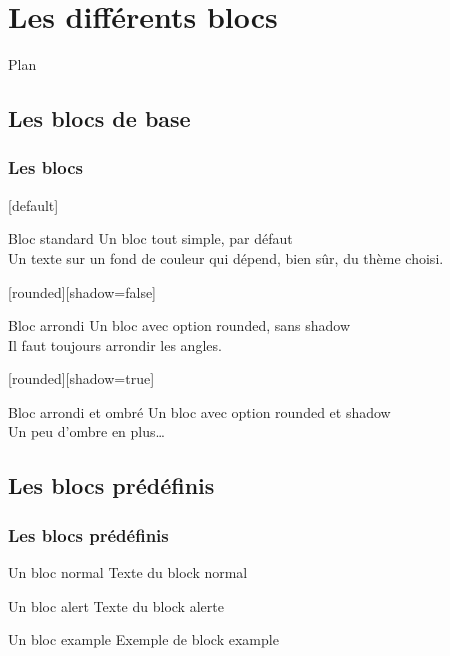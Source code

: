 \documentclass[slidetop,11pt]{beamer}
\begin{document}
\section{Les différents blocs}
\begin{frame}{Plan}
  \tableofcontents[sections=\thesection]
\end{frame}

\subsection{Les blocs de base}
\begin{frame} 
\frametitle{Les blocs}
[default]  
\begin{block}{Bloc standard}
Un bloc tout simple, par défaut\\
Un texte sur un fond de couleur qui
dépend, bien sûr, du thème choisi.
\end{block}

[rounded][shadow=false]
\begin{block}{Bloc arrondi}
Un bloc avec option rounded, sans shadow\\
Il faut toujours arrondir les angles.
\end{block}

[rounded][shadow=true]
\begin{block}{Bloc arrondi et ombré}
Un bloc avec option rounded et shadow\\
Un peu d'ombre en plus\dots
\end{block}
\end{frame}
\subsection{Les blocs prédéfinis}
\begin{frame}
\frametitle{Les blocs prédéfinis} 
\begin{block}{Un bloc normal}
Texte du block normal
\end{block}

\begin{alertblock}{Un bloc alert}
Texte du block alerte
\end{alertblock}

\begin{exampleblock}{Un bloc example}
Exemple de block example
\end{exampleblock}
\end{frame}
\end{document}
